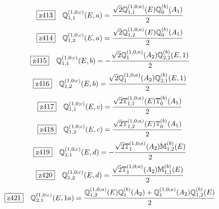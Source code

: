 \documentclass[fleqn,10pt,landscape]{jsarticle}
\begin{document}
\begin{dmath*}
\hspace*{3mm}\fbox{z413}\quad \mathbb{Q}_{1,1}^{(1,0;c)}(E,a)=\frac{\sqrt{2} \mathbb{Q}_{1,1}^{(1,0;a)}(E) \mathbb{Q}_{0}^{(b)}(A_{1})}{2}
\end{dmath*}
\begin{dmath*}
\hspace*{3mm}\fbox{z414}\quad \mathbb{Q}_{1,2}^{(1,0;c)}(E,a)=\frac{\sqrt{2} \mathbb{Q}_{1,2}^{(1,0;a)}(E) \mathbb{Q}_{0}^{(b)}(A_{1})}{2}
\end{dmath*}
\begin{dmath*}
\hspace*{3mm}\fbox{z415}\quad \mathbb{Q}_{1,1}^{(1,0;c)}(E,b)=- \frac{\sqrt{2} \mathbb{Q}_{1}^{(1,0;a)}(A_{2}) \mathbb{Q}_{2,2}^{(b)}(E,1)}{2}
\end{dmath*}
\begin{dmath*}
\hspace*{3mm}\fbox{z416}\quad \mathbb{Q}_{1,2}^{(1,0;c)}(E,b)=\frac{\sqrt{2} \mathbb{Q}_{1}^{(1,0;a)}(A_{2}) \mathbb{Q}_{2,1}^{(b)}(E,1)}{2}
\end{dmath*}
\begin{dmath*}
\hspace*{3mm}\fbox{z417}\quad \mathbb{Q}_{1,1}^{(1,0;c)}(E,c)=\frac{\sqrt{2} \mathbb{T}_{1,1}^{(1,0;a)}(E) \mathbb{T}_{0}^{(b)}(A_{1})}{2}
\end{dmath*}
\begin{dmath*}
\hspace*{3mm}\fbox{z418}\quad \mathbb{Q}_{1,2}^{(1,0;c)}(E,c)=\frac{\sqrt{2} \mathbb{T}_{1,2}^{(1,0;a)}(E) \mathbb{T}_{0}^{(b)}(A_{1})}{2}
\end{dmath*}
\begin{dmath*}
\hspace*{3mm}\fbox{z419}\quad \mathbb{Q}_{1,1}^{(1,0;c)}(E,d)=- \frac{\sqrt{2} \mathbb{T}_{1}^{(1,0;a)}(A_{2}) \mathbb{M}_{1,2}^{(b)}(E)}{2}
\end{dmath*}
\begin{dmath*}
\hspace*{3mm}\fbox{z420}\quad \mathbb{Q}_{1,2}^{(1,0;c)}(E,d)=\frac{\sqrt{2} \mathbb{T}_{1}^{(1,0;a)}(A_{2}) \mathbb{M}_{1,1}^{(b)}(E)}{2}
\end{dmath*}
\begin{dmath*}
\hspace*{3mm}\fbox{z421}\quad \mathbb{Q}_{2,1}^{(1,0;c)}(E,1a)=\frac{\mathbb{Q}_{1,2}^{(1,0;a)}(E) \mathbb{Q}_{1}^{(b)}(A_{2}) + \mathbb{Q}_{1}^{(1,0;a)}(A_{2}) \mathbb{Q}_{1,2}^{(b)}(E)}{2}
\end{dmath*}
\end{document}
